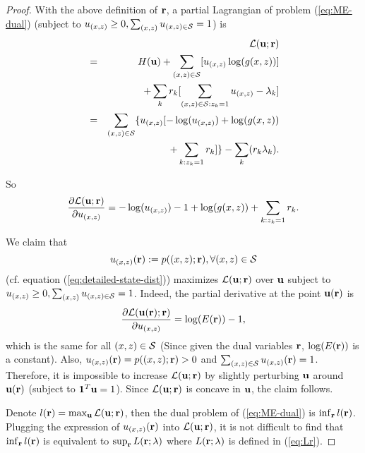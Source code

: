 \documentclass{IEEEtran}
\begin{document}
\begin{proof}
With the above definition of ${\bf r}$, a partial Lagrangian of problem
(\ref{eq:ME-dual}) (subject to $u_{(x,z)}\ge0,\sum_{(x,z)}u_{(x,z)\in{\cal S}}=1$)
is\begin{eqnarray}
 &  & {\cal L}({\bf u};{\bf r})\nonumber \\
 & = & H({\bf u})+\sum_{(x,z)\in{\cal S}}[u_{(x,z)}\log(g(x,z))]\nonumber \\
 &  & +\sum_{k}r_{k}[\sum_{(x,z)\in{\cal S}:z_{k}=1}u_{(x,z)}-\lambda_{k}]\nonumber \\
 & = & \sum_{(x,z)\in{\cal S}}\{u_{(x,z)}[-\log(u_{(x,z)})+\log(g(x,z))\nonumber \\
 &  & +\sum_{k:z_{k}=1}r_{k}]\}-\sum_{k}(r_{k}\lambda_{k}).\label{eq:partial-L}\end{eqnarray}


So\[
\frac{\partial{\cal L}({\bf u};{\bf r})}{\partial u_{(x,z)}}=-\log(u_{(x,z)})-1+\log(g(x,z))+\sum_{k:z_{k}=1}r_{k}.\]


We claim that \begin{equation}
u_{(x,z)}({\bf r}):=p((x,z);{\bf r}),\forall(x,z)\in{\cal S}\label{eq:Lagrangian-maximizer}\end{equation}
 (cf. equation (\ref{eq:detailed-state-dist})) maximizes ${\cal L}({\bf u};{\bf r})$
over ${\bf u}$ subject to $u_{(x,z)}\ge0,\sum_{(x,z)}u_{(x,z)\in{\cal S}}=1$.
Indeed, the partial derivative at the point ${\bf u}({\bf r})$ is\[
\frac{\partial{\cal L}({\bf u}({\bf r});{\bf r})}{\partial u_{(x,z)}}=\log(E({\bf r}))-1,\]
which is the same for all $(x,z)\in{\cal S}$ (Since given the dual
variables ${\bf r}$, $\log(E({\bf r}))$ is a constant). Also, $u_{(x,z)}({\bf r})=p((x,z);{\bf r})>0$
and $\sum_{(x,z)\in{\cal S}}u_{(x,z)}({\bf r})=1$. Therefore, it
is impossible to increase ${\cal L}({\bf u};{\bf r})$ by slightly
perturbing ${\bf u}$ around ${\bf u}({\bf r})$ (subject to ${\bf 1}^{T}{\bf u}=1$).
Since ${\cal L}({\bf u};{\bf r})$ is concave in ${\bf u}$, the claim
follows. 

Denote $l({\bf r})=\max_{{\bf u}}{\cal L}({\bf u};{\bf r})$, then
the dual problem of (\ref{eq:ME-dual}) is $\inf_{{\bf r}}l({\bf r})$.
Plugging the expression of $u_{(x,z)}({\bf r})$ into ${\cal L}({\bf u};{\bf r})$,
it is not difficult to find that $\inf_{{\bf r}}l({\bf r})$ is equivalent
to $\sup_{{\bf r}}L({\bf r};{\bf \lambda})$ where $L({\bf r};{\bf \lambda})$
is defined in (\ref{eq:Lr}).


\end{proof}
\end{document}
